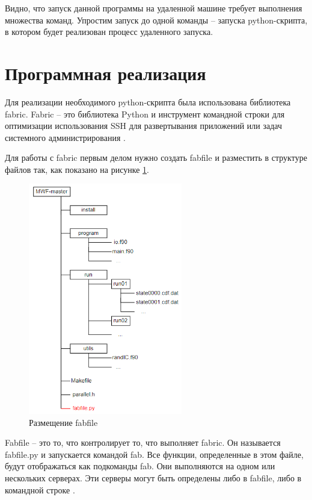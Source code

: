Видно, что запуск данной программы на удаленной машине требует выполнения множества команд. Упростим запуск до одной команды -- запуска python-скрипта, в котором будет реализован процесс удаленного запуска.

\section{Программная реализация}

Для реализации необходимого python-скрипта была использована библиотека fabric. Fabric – это библиотека Python и инструмент командной строки для оптимизации использования SSH для развертывания приложений или задач системного администрирования \cite{fabric-doc}.

Для работы с fabric первым делом нужно создать fabfile и разместить в структуре файлов так, как показано на рисунке \ref{structure_fab}.
\begin{figure}[!ht]
	\centering
	\includegraphics[width=0.6\textwidth]{ResearchNotes/rndcmp_not_rcs_2022_06_17/MWF-иерархия_fab.png}
	\caption{Размещение fabfile}\label{structure_fab}
\end{figure} 

Fabfile -- это то, что контролирует то, что выполняет fabric. Он называется fabfile.py и запускается командой fab. Все функции, определенные в этом файле, будут отображаться как подкоманды fab. Они выполняются на одном или нескольких серверах. Эти серверы могут быть определены либо в fabfile, либо в командной строке \cite{fabric-fab}.

